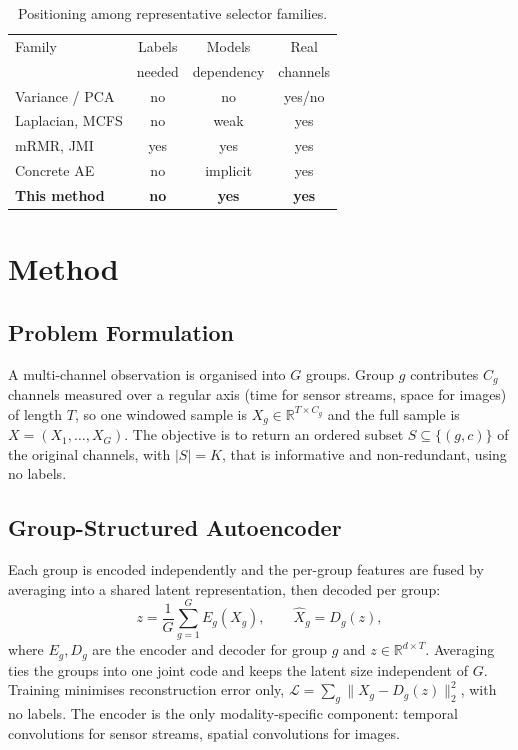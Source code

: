 \documentclass[conference]{IEEEtran}
\begin{document}
\begin{table}[t]
\caption{Positioning among representative selector families.}
\label{tab:positioning}
\centering
\footnotesize
\setlength{\tabcolsep}{3.5pt}
\renewcommand{\arraystretch}{1.1}
\begin{tabular}{@{}lccc@{}}
\toprule
Family & Labels & Models & Real \\
 & needed & dependency & channels \\
\midrule
Variance / PCA & no & no & yes/no \\
Laplacian, MCFS & no & weak & yes \\
mRMR, JMI & yes & yes & yes \\
Concrete AE & no & implicit & yes \\
\textbf{This method} & \textbf{no} & \textbf{yes} & \textbf{yes} \\
\bottomrule
\end{tabular}
\end{table}

\section{Method}
\subsection{Problem Formulation}
A multi-channel observation is organised into $G$ groups. Group $g$ contributes
$C_g$ channels measured over a regular axis (time for sensor streams, space for
images) of length $T$, so one windowed sample is $X_g \in \mathbb{R}^{T\times
C_g}$ and the full sample is $X=(X_1,\dots,X_G)$. The objective is to return an
ordered subset $S\subseteq\{(g,c)\}$ of the original channels, with $|S|=K$, that
is informative and non-redundant, using no labels.

\subsection{Group-Structured Autoencoder}
Each group is encoded independently and the per-group features are fused by
averaging into a shared latent representation, then decoded per group:
\begin{equation}
z = \frac{1}{G}\sum_{g=1}^{G} E_g(X_g), \qquad \hat{X}_g = D_g(z),
\end{equation}
where $E_g,D_g$ are the encoder and decoder for group $g$ and $z\in\mathbb{R}^{d
\times T}$. Averaging ties the groups into one joint code and keeps the latent
size independent of $G$. Training minimises reconstruction error only,
$\mathcal{L}=\sum_{g}\|X_g-D_g(z)\|_2^2$, with no labels. The encoder is the only
modality-specific component: temporal convolutions for sensor streams, spatial
convolutions for images.
\end{document}

